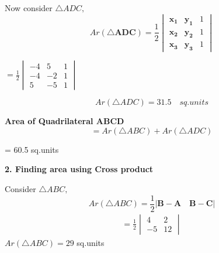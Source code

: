 \documentclass[journal,12pt,twocolumn]{IEEEtran}
\let\vec\mathbf
\begin{document}
\vspace{0.3cm}
\noindent Now consider $ \triangle ADC, $
\begin{equation}
Ar(\triangle \vec{ADC})= \frac{1}{2} \begin{vmatrix}
                    \vec{x_1} & \vec{y_1} & 1\\
                    \vec{x_2} & \vec{y_2} & 1\\
                    \vec{x_3} & \vec{y_3} & 1
                   \end{vmatrix} 
\end{equation} 
\begin{center}
$ = \frac{1}{2} \begin{vmatrix}
                    -4 &  5 & 1\\
                    -4 & -2 & 1\\
                     5 & -5 & 1
                   \end{vmatrix} $
\end{center}
\vspace{0.2cm}
\begin{equation}
Ar(\triangle ADC)= 31.5 \quad sq.units 
\end{equation}

\boldmath
\vspace{0.2cm}
\textbf{Area of Quadrilateral ABCD} 
\begin{equation}
 = Ar(\triangle ABC)+Ar(\triangle ADC)
\end{equation}
\begin{center}
 = 60.5  sq.units
\end{center}

\newpage
\vspace{0.2cm} 
\textbf{2. Finding area using Cross product} \\
\vspace{0.25cm}

Consider $ \triangle ABC, $
\begin{equation}
 Ar(\triangle ABC)= \frac{1}{2}|\vec{B-A} \quad \vec{B-C}| 
\end{equation}
\unboldmath
\begin{align}
= \frac{1}{2} \begin{vmatrix}
                    4 & 2\\
                   -5 & 12
                   \end{vmatrix} 
\end{align}
$ Ar(\triangle ABC)= 29 $ sq.units 
\end{document}
